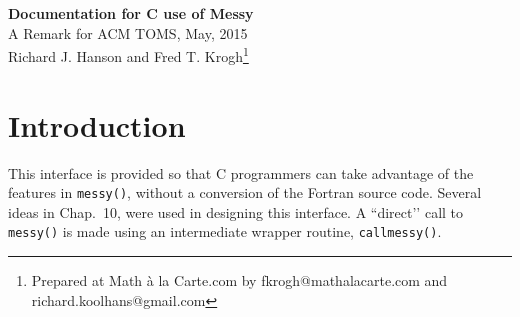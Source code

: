 \documentclass[12pt]{article}
\begin{document}
\pagestyle{fred}
\thispagestyle{empty}
\begin{center}
  {\LARGE \bf Documentation for C use of Messy}
  \\[10pt]
  {\large A Remark for ACM TOMS, May, 2015\\[5pt]
    Richard J. Hanson and Fred T. Krogh\footnote{Prepared at Math \`a la
      Carte.com by fkrogh@mathalacarte.com and
      richard.koolhans@gmail.com}\vspace{10pt}}
\end{center}

\begin{abstract}
  This document gives additional information on use of the Fortran code {\tt
    messy()} described in \cite{Krogh:2014:FMP} but called from C routines using
  the name {\tt cmessy()}.  A C test driver illustrates several ways of using
  the code in that environment.  Library versions are created for C that support
  float and double floating point data formats.  Equivalent functionality is
  maintained for the C and Fortran versions in those precisions.  Creating a
  library usable by C routines requires the use of inter-operable Fortran and C
  compilers.  A preliminary step requires using a Fortran compiler to create a
  library or equivalent object files.
\end{abstract}

\tableofcontents


\section{Introduction}
\label{sec:introduction}

This interface is provided so that C programmers can take advantage of the
features in {\tt messy()}, without a conversion of the Fortran source code.
  Several ideas in Chap.~10, \cite{HandH:2013:HH} were used in
designing this interface.  A ``direct\rq{}\rq{} call to {\tt messy()} is made
using an intermediate wrapper routine, {\tt callmessy()}.
\end{document}
